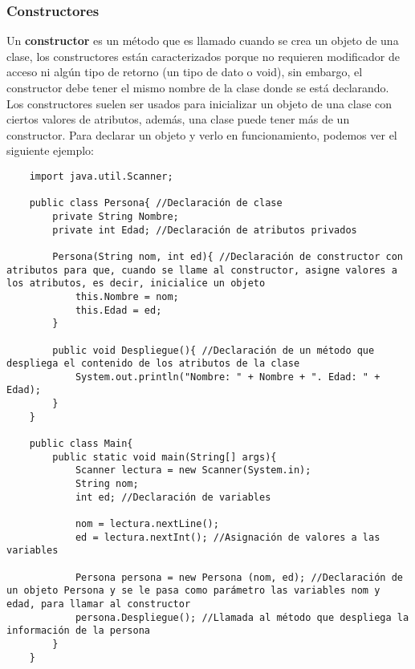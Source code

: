\subsubsection{Constructores}
Un \textbf{constructor} es un método que es llamado cuando se crea un objeto de una clase, los constructores están caracterizados porque no requieren modificador de acceso ni algún tipo de retorno (un tipo de dato o void), sin embargo, el constructor debe tener el mismo nombre de la clase donde se está declarando.\\
Los constructores suelen ser usados para inicializar un objeto de una clase con ciertos valores de atributos, además, una clase puede tener más de un constructor. Para declarar un objeto y verlo en funcionamiento, podemos ver el siguiente ejemplo:
\begin{lstlisting}
    import java.util.Scanner;
    
    public class Persona{ //Declaración de clase
        private String Nombre;
        private int Edad; //Declaración de atributos privados
        
        Persona(String nom, int ed){ //Declaración de constructor con atributos para que, cuando se llame al constructor, asigne valores a los atributos, es decir, inicialice un objeto
            this.Nombre = nom;
            this.Edad = ed;
        }
        
        public void Despliegue(){ //Declaración de un método que despliega el contenido de los atributos de la clase
            System.out.println("Nombre: " + Nombre + ". Edad: " + Edad);
        }
    }
    
    public class Main{
        public static void main(String[] args){
            Scanner lectura = new Scanner(System.in);
            String nom;
            int ed; //Declaración de variables
            
            nom = lectura.nextLine();
            ed = lectura.nextInt(); //Asignación de valores a las variables
            
            Persona persona = new Persona (nom, ed); //Declaración de un objeto Persona y se le pasa como parámetro las variables nom y edad, para llamar al constructor
            persona.Despliegue(); //Llamada al método que despliega la información de la persona
        }
    }
\end{lstlisting}

